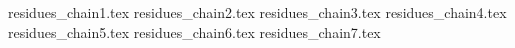 residues_chain1.tex             
residues_chain2.tex             
residues_chain3.tex             
residues_chain4.tex             
residues_chain5.tex             
residues_chain6.tex             
residues_chain7.tex             
